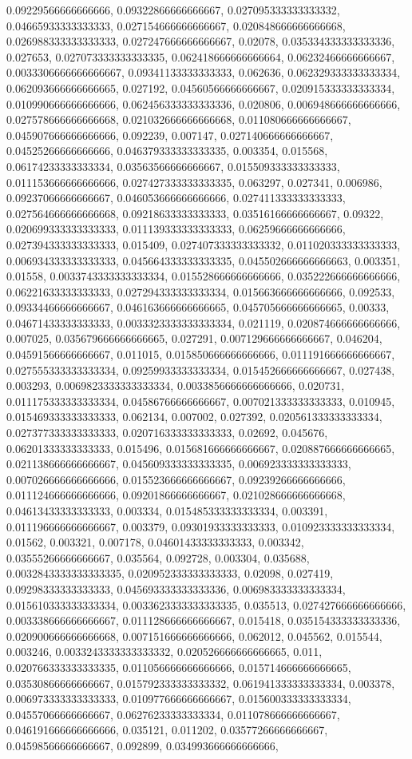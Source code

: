 0.09229566666666666, 0.09322866666666667, 0.027095333333333332, 0.04665933333333333, 0.027154666666666667, 0.020848666666666668, 0.026988333333333333, 0.027247666666666667, 0.02078, 0.035334333333333336, 0.027653, 0.027073333333333335, 0.062418666666666664, 0.06232466666666667, 0.0033306666666666667, 0.09341133333333333, 0.062636, 0.062329333333333334, 0.062093666666666665, 0.027192, 0.04560566666666667, 0.020915333333333334, 0.010990666666666666, 0.062456333333333336, 0.020806, 0.006948666666666666, 0.027578666666666668, 0.021032666666666668, 0.011080666666666667, 0.045907666666666666, 0.092239, 0.007147, 0.027140666666666667, 0.04525266666666666, 0.046379333333333335, 0.003354, 0.015568, 0.06174233333333334, 0.03563566666666667, 0.015509333333333333, 0.011153666666666666, 0.027427333333333335, 0.063297, 0.027341, 0.006986, 0.09237066666666667, 0.046053666666666666, 0.027411333333333333, 0.027564666666666668, 0.09218633333333333, 0.03516166666666667, 0.09322, 0.020699333333333333, 0.011139333333333333, 0.06259666666666666, 0.027394333333333333, 0.015409, 0.027407333333333332, 0.011020333333333333, 0.006934333333333333, 0.045664333333333335, 0.045502666666666663, 0.003351, 0.01558, 0.0033743333333333334, 0.015528666666666666, 0.035222666666666666, 0.06221633333333333, 0.027294333333333334, 0.015663666666666666, 0.092533, 0.09334466666666667, 0.046163666666666665, 0.045705666666666665, 0.00333, 0.04671433333333333, 0.0033323333333333334, 0.021119, 0.020874666666666666, 0.007025, 0.035679666666666665, 0.027291, 0.007129666666666667, 0.046204, 0.04591566666666667, 0.011015, 0.015850666666666666, 0.011191666666666667, 0.027555333333333334, 0.09259933333333334, 0.015452666666666667, 0.027438, 0.003293, 0.0069823333333333334, 0.0033856666666666666, 0.020731, 0.011175333333333334, 0.04586766666666667, 0.007021333333333333, 0.010945, 0.015469333333333333, 0.062134, 0.007002, 0.027392, 0.020561333333333334, 0.027377333333333333, 0.020716333333333333, 0.02692, 0.045676, 0.06201333333333333, 0.015496, 0.015681666666666667, 0.020887666666666665, 0.021138666666666667, 0.045609333333333335, 0.006923333333333333, 0.007026666666666666, 0.015523666666666667, 0.09239266666666666, 0.011124666666666666, 0.09201866666666667, 0.021028666666666668, 0.04613433333333333, 0.003334, 0.015485333333333334, 0.003391, 0.011196666666666667, 0.003379, 0.09301933333333333, 0.010923333333333334, 0.01562, 0.003321, 0.007178, 0.04601433333333333, 0.003342, 0.03555266666666667, 0.035564, 0.092728, 0.003304, 0.035688, 0.0032843333333333335, 0.020952333333333333, 0.02098, 0.027419, 0.09298333333333333, 0.045693333333333336, 0.006983333333333334, 0.015610333333333334, 0.0033623333333333335, 0.035513, 0.027427666666666666, 0.003338666666666667, 0.011128666666666667, 0.015418, 0.035154333333333336, 0.020900666666666668, 0.007151666666666666, 0.062012, 0.045562, 0.015544, 0.003246, 0.0033243333333333332, 0.020526666666666665, 0.011, 0.020766333333333335, 0.011056666666666666, 0.015714666666666665, 0.03530866666666667, 0.015792333333333332, 0.061941333333333334, 0.003378, 0.006973333333333333, 0.010977666666666667, 0.015600333333333334, 0.04557066666666667, 0.06276233333333334, 0.011078666666666667, 0.046191666666666666, 0.035121, 0.011202, 0.03577266666666667, 0.04598566666666667, 0.092899, 0.034993666666666666, 